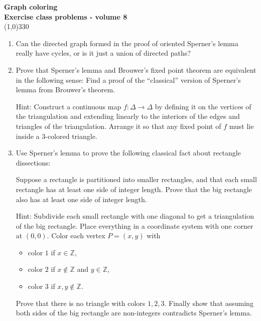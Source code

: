 \documentclass[a4paper]{article}
\newcommand{\ZZ}{\mathbb{Z}}
\begin{document}
\pagestyle{empty}
\begin{center}
	{\Large\bf Graph coloring}\\
	{\large\bf Exercise class problems - volume 8}\\
	\line(1,0){330}
\end{center}


\begin{enumerate}
\item Can the directed graph formed in the proof of oriented Sperner's lemma really have cycles, or is it just a union of directed paths?

\item Prove that Sperner's lemma and Brouwer's fixed point theorem are equivalent in the following sense: Find a proof of the ``classical'' version of Sperner's lemma from Brouwer's theorem.

\smallskip
Hint: Construct a continuous map $f:\Delta\to \Delta$ by defining it on the vertices of the triangulation and extending linearly to the interiors of the edges and triangles of the triangulation. Arrange it so that any fixed point of $f$ must lie inside a $3$-colored triangle.

\item Use Sperner's lemma to prove the following classical fact about rectangle dissections:

Suppose a rectangle is partitioned into smaller rectangles, and that each small rectangle has at least one side of integer length. Prove that the big rectangle also has at least one side of integer length.

\smallskip
Hint: Subdivide each small rectangle with one diagonal to get a triangulation of the big rectangle. Place everything in a coordinate system with one corner at $(0,0)$. Color each vertex $P=(x,y)$ with 
\begin{itemize}
\item color $1$ if $x\in\ZZ$,
\item color $2$ if $x\not\in\ZZ$ and $y\in \ZZ$,
\item color $3$ if $x,y\not\in\ZZ$.
\end{itemize}
Prove that there is no triangle with colors $1,2,3$. Finally show that assuming both sides of the big rectangle are non-integers contradicts Sperner's lemma.
\end{enumerate}
\end{document}
